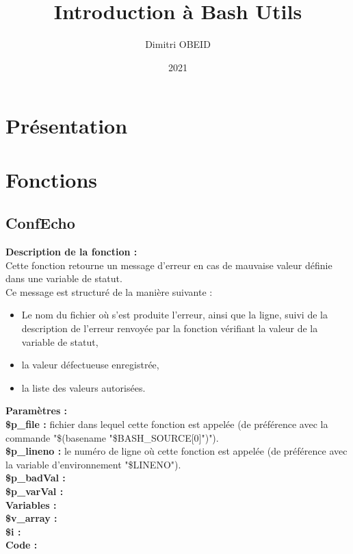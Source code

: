 \documentclass[a4paper,10pt]{article}
\title{\color{red}Introduction à Bash Utils}\color{white}
\author{Dimitri OBEID}
\date{2021}
\begin{document}
\maketitle
\newpage

\hypertarget{contents}{}
\tableofcontents
\newpage

\color{red}
\section{Présentation}\color{white}


\color{red}
\section{Fonctions}\color{white}

\color{green}
\subsection{ConfEcho}\color{white}
\begin{flushleft}
	\textbf{Description de la fonction :}\\
   	Cette fonction retourne un message d'erreur en cas de mauvaise valeur définie dans une variable de statut.\\[1\baselineskip]
   	Ce message est structuré de la manière suivante :\\
   	\begin{itemize}
   		\item Le nom du fichier où s'est produite l'erreur, ainsi que la ligne, suivi de la description de l'erreur renvoyée par la fonction vérifiant la valeur de la variable de statut,
   		\item la valeur défectueuse enregistrée,
   		\item la liste des valeurs autorisées.\\[1\baselineskip]
   	\end{itemize}

   	\textbf{Paramètres :}\\
   	\color{orange}\textbf{\$p\_file\color{white} :} \color{white} fichier dans lequel cette fonction est appelée (de préférence avec la commande "\$(\color{gray}basename \color{white}"\color{orange}\$BASH\_SOURCE[0]\color{white}")").\\
   	\color{orange}\textbf{\$p\_lineno\color{white} :} \color{white} le numéro de ligne où cette fonction est appelée (de préférence avec la variable d'environnement "\color{orange}\$LINENO\color{white}").\\
   	\color{orange}\textbf{\$p\_badVal\color{white} :} \color{white}\\
   	\color{orange}\textbf{\$p\_varVal\color{white} :} \color{white}\\[1\baselineskip]
    
   	\textbf{Variables :}\\
   	\color{orange}\textbf{\$v\_array\color{white} :} \color{white} \\
   	\color{orange}\textbf{\$i\color{white} :} \color{white}\\[1\baselineskip]

    \textbf{Code :}\\
\end{flushleft}
\end{document}
